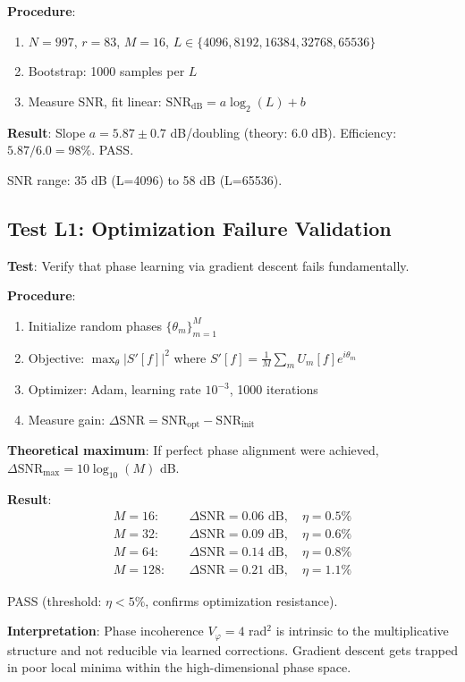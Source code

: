 \documentclass[10pt,twocolumn]{article}
\begin{document}
\textbf{Procedure}:
\begin{enumerate}
\item $N = 997$, $r = 83$, $M = 16$, $L \in \{4096, 8192, 16384, 32768, 65536\}$
\item Bootstrap: 1000 samples per $L$
\item Measure SNR, fit linear: $\text{SNR}_{\text{dB}} = a \log_2(L) + b$
\end{enumerate}

\textbf{Result}: Slope $a = 5.87 \pm 0.7$ dB/doubling (theory: 6.0 dB). Efficiency: $5.87/6.0 = 98\%$. PASS.

SNR range: 35 dB (L=4096) to 58 dB (L=65536).

\subsection{Test L1: Optimization Failure Validation}

\textbf{Test}: Verify that phase learning via gradient descent fails fundamentally.

\textbf{Procedure}:
\begin{enumerate}
\item Initialize random phases $\{\theta_m\}_{m=1}^M$
\item Objective: $\max_{\theta} |S'[f]|^2$ where $S'[f] = \frac{1}{M} \sum_m U_m[f] e^{i\theta_m}$
\item Optimizer: Adam, learning rate $10^{-3}$, 1000 iterations
\item Measure gain: $\Delta \text{SNR} = \text{SNR}_{\text{opt}} - \text{SNR}_{\text{init}}$
\end{enumerate}

\textbf{Theoretical maximum}: If perfect phase alignment were achieved, $\Delta \text{SNR}_{\max} = 10\log_{10}(M)$ dB.

\textbf{Result}:
\begin{align}
M = 16: \quad &\Delta \text{SNR} = 0.06 \text{ dB}, \quad \eta = 0.5\% \\
M = 32: \quad &\Delta \text{SNR} = 0.09 \text{ dB}, \quad \eta = 0.6\% \\
M = 64: \quad &\Delta \text{SNR} = 0.14 \text{ dB}, \quad \eta = 0.8\% \\
M = 128: \quad &\Delta \text{SNR} = 0.21 \text{ dB}, \quad \eta = 1.1\%
\end{align}

PASS (threshold: $\eta < 5\%$, confirms optimization resistance).

\textbf{Interpretation}: Phase incoherence $V_\varphi = 4$ rad$^2$ is intrinsic to the multiplicative structure and not reducible via learned corrections. Gradient descent gets trapped in poor local minima within the high-dimensional phase space.
\end{document}
